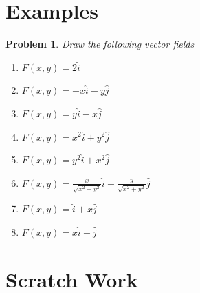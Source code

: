 \documentclass[11pt]{article}
\newtheorem{problem}{Problem}
\begin{document}
\section{Examples}

\begin{problem}
    Draw the following vector fields

    \begin{enumerate}
        \item $F(x,y) = 2\hat{i}$
        \item $F(x,y) = -x\hat{i} - y\hat{j}$
        \item $F(x,y) = y\hat{i} - x\hat{j}$
        \item $F(x,y) = x^2 \hat{i} + y^2\hat{j}$
        \item $F(x,y) = y^2 \hat{i} + x^2 \hat{j}$
        \item $F(x,y) = \frac{x}{\sqrt{x^2+y^2}}\hat{i} + \frac{y}{\sqrt{x^2+y^2}}\hat{j}$
        \item $F(x,y) = \hat{i} + x\hat{j}$
        \item $F(x,y) = x \hat{i} + \hat{j}$
    \end{enumerate}
\end{problem}



\section{Scratch Work}
\end{document}
